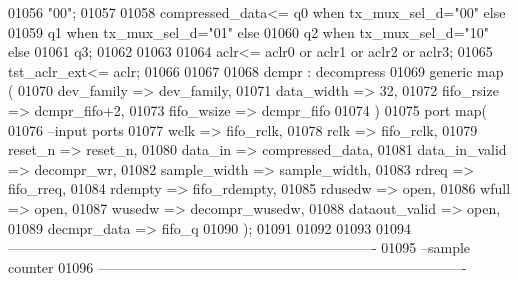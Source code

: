 \begin{DoxyCode}
01056                \textcolor{vhdllogic}{"00"};
01057               
01058     \textcolor{vhdlchar}{compressed_data}\textcolor{vhdlchar}{<=} \textcolor{vhdlchar}{q0} \textcolor{keywordflow}{when} \textcolor{vhdlchar}{tx_mux_sel_d}\textcolor{vhdlchar}{=}\textcolor{vhdllogic}{"00"} \textcolor{keywordflow}{else}
01059                 \textcolor{vhdlchar}{q1} \textcolor{keywordflow}{when} \textcolor{vhdlchar}{tx_mux_sel_d}\textcolor{vhdlchar}{=}\textcolor{vhdllogic}{"01"} \textcolor{keywordflow}{else}
01060                 \textcolor{vhdlchar}{q2} \textcolor{keywordflow}{when} \textcolor{vhdlchar}{tx_mux_sel_d}\textcolor{vhdlchar}{=}\textcolor{vhdllogic}{"10"} \textcolor{keywordflow}{else}
01061                 \textcolor{vhdlchar}{q3};
01062                       
01063                   
01064 \textcolor{vhdlchar}{aclr}\textcolor{vhdlchar}{<=} \textcolor{vhdlchar}{aclr0} \textcolor{keywordflow}{or} \textcolor{vhdlchar}{aclr1} \textcolor{keywordflow}{or} \textcolor{vhdlchar}{aclr2} \textcolor{keywordflow}{or} \textcolor{vhdlchar}{aclr3};
01065 \textcolor{vhdlchar}{tst_aclr_ext}\textcolor{vhdlchar}{<=} \textcolor{vhdlchar}{aclr};
01066 
01067 
01068 dcmpr :  decompress 
01069   \textcolor{keywordflow}{generic} \textcolor{keywordflow}{map}  (
01070                     dev_family => dev_family,
01071                     data_width => \textcolor{vhdllogic}{32},
01072                fifo_rsize => dcmpr\_fifo+2,
01073                     fifo_wsize => dcmpr_fifo
01074                     \textcolor{vhdlchar}{)}
01075   \textcolor{keywordflow}{port} \textcolor{keywordflow}{map}(
01076 \textcolor{keyword}{        --input ports }
01077         wclk          => fifo_rclk,  
01078         rclk          => fifo_rclk, 
01079         reset_n       => reset_n, 
01080         data_in       => compressed_data, 
01081         data_in_valid => decompr_wr, 
01082         sample_width  => sample_width,
01083         rdreq         => fifo_rreq,
01084         rdempty       => fifo_rdempty,
01085         rdusedw       => \textcolor{keywordflow}{open}, 
01086         wfull         => \textcolor{keywordflow}{open}, 
01087         wusedw        => decompr_wusedw,
01088         dataout_valid => \textcolor{keywordflow}{open},  
01089         decmpr_data   => fifo_q     
01090         \textcolor{vhdlchar}{)};
01091  
01092         
01093         
01094 \textcolor{keyword}{-------------------------------------------------------------------------------}
01095 \textcolor{keyword}{--sample counter}
01096 \textcolor{keyword}{-------------------------------------------------------------------------------}

\end{DoxyCode}
